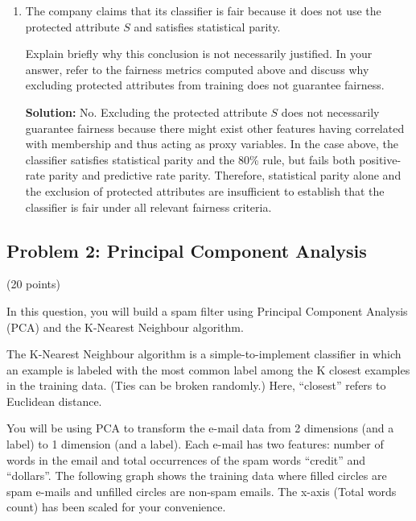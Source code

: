 \documentclass{article}
\begin{document}
\begin{enumerate}
$P(Y=1 \mid \hat{Y}=1,S=1)=\frac{30}{40}=0.75$

$P(Y=1 \mid \hat{Y}=1,S=0)=\frac{20}{40}=0.5$

Since the positive predictive values aren't equal across groups ($0.75\neq0.5$), predictive rate parity is not satisfied.

\item[(f)] The company claims that its classifier is fair because
it does not use the protected attribute $S$ and satisfies
statistical parity.

Explain briefly why this conclusion is not necessarily justified.
In your answer, refer to the fairness metrics computed above
and discuss why excluding protected attributes from training
does not guarantee fairness.

\textbf{Solution:} No. Excluding the protected attribute $S$ does not necessarily guarantee fairness because there might exist other features having correlated with membership and thus acting as proxy variables. In the case above, the classifier satisfies statistical parity and the 80\% rule, but fails both positive-rate parity and predictive rate parity. Therefore, statistical parity alone and the exclusion of protected attributes are insufficient to establish that the classifier is fair under all relevant fairness criteria.

\end{enumerate}
\newpage
\subsection*{Problem 2: Principal Component Analysis}
(20 points)

\bigskip
In this question, you will build a spam filter using Principal Component Analysis (PCA) and the K-Nearest Neighbour algorithm.

\medskip
The K-Nearest Neighbour algorithm is a simple-to-implement classifier in which an example is labeled with the most common label among the K closest examples in the training data.
(Ties can be broken randomly.)
Here, ``closest'' refers to Euclidean distance.

\medskip

You will be using PCA to transform the e-mail data from 2 dimensions (and a label) to 1 dimension (and a label). Each e-mail has two features: number of words in the email and total occurrences of the spam words ``credit'' and ``dollars''. The following graph shows the training data where filled circles are spam e-mails and unfilled circles are non-spam emails. The x-axis (Total words count) has been scaled for your convenience.
\end{document}
